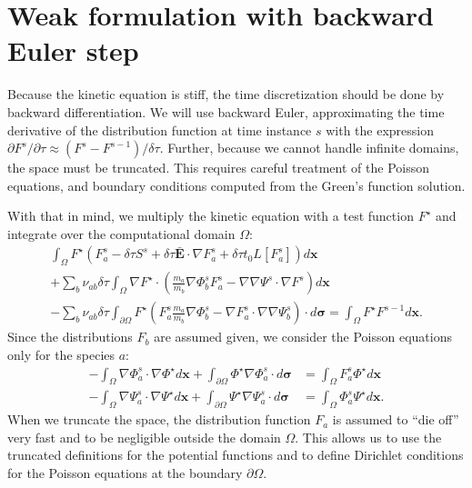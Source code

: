 \documentclass[preprint]{revtex4}
\begin{document}
\section{Weak formulation with backward Euler step}
Because the kinetic equation is stiff, the time discretization should be done by backward differentiation. We will use backward Euler, approximating the time derivative of the distribution function at time instance $s$ with the expression $\partial F^{s}/\partial\tau\approx (F^{s}-F^{s-1})/\delta \tau$. Further, because we cannot handle infinite domains, the space must be truncated. This requires careful treatment of the Poisson equations, and boundary conditions computed from the Green's function solution.

 With that in mind, we multiply the kinetic equation with a test function $F^{\star}$ and integrate over the computational domain $\Omega$:
\begin{multline}
\int_{\Omega}F^{\star}\left(F_a^s -\delta\tau S^s+\delta\tau\bar{\bm{E}}\cdot\nabla F_a^s+\delta\tau t_0L[F_a^s]\right)d\bm{x}
\\+\sum_b\nu_{ab}\delta\tau\int_{\Omega}\nabla F^{\star}\cdot\left(\frac{m_a}{m_b}\nabla \Phi_b^s F_a^s-\nabla\nabla\Psi^s\cdot\nabla F^s\right)d\bm{x}\\
-\sum_b\nu_{ab}\delta\tau\int_{\partial\Omega}F^{\star}\left(F_a^s\frac{m_a}{m_b}\nabla\Phi_b^s-\nabla F_a^s\cdot\nabla\nabla\Psi_b^s\right)\cdot d\bm{\sigma}
=\int_{\Omega}F^{\star}F^{s-1}d\bm{x}.
\end{multline}
Since the distributions $F_b$ are assumed given, we consider the Poisson equations only for the species $a$:
\begin{align}
-\int_{\Omega}\nabla\Phi_a^s\cdot\nabla\Phi^{\star}d\bm{x}+\int_{\partial\Omega}\Phi^{\star}\nabla\Phi_a^s\cdot d\bm{\sigma}&=\int_{\Omega}F_a^s\Phi^{\star}d\bm{x}\\
-\int_{\Omega}\nabla\Psi_a^s\cdot\nabla\Psi^{\star}d\bm{x}+\int_{\partial\Omega}\Psi^{\star}\nabla\Psi_a^s\cdot d\bm{\sigma}&=\int_{\Omega}\Phi_a^s\Psi^{\star}d\bm{x}.
\end{align}
When we truncate the space, the distribution function $F_a$ is assumed to ``die off'' very fast and to be negligible outside the domain $\Omega$. This allows us to use the truncated definitions for the potential functions and to define Dirichlet conditions for the Poisson equations at the boundary $\partial\Omega$. 
\end{document}
